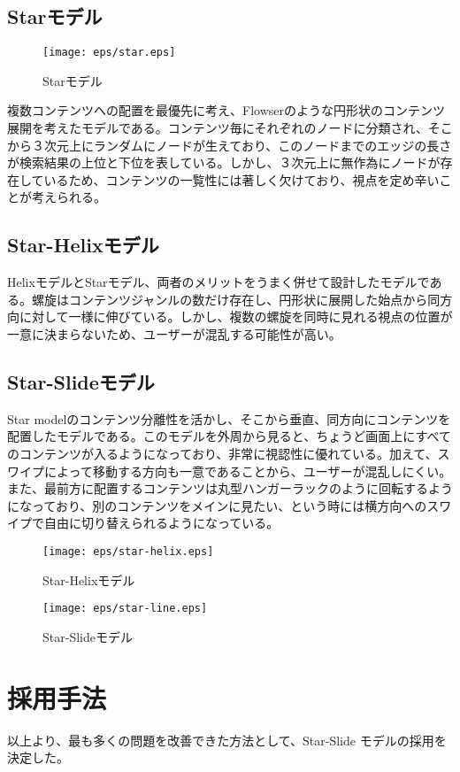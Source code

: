 \subsection{Starモデル}
\begin{figure}[htbp]
\begin{center}
\texttt{[image: eps/star.eps]}
\caption{Starモデル}
\label{star}
\end{center}
\end{figure}
複数コンテンツへの配置を最優先に考え、Flowserのような円形状のコンテンツ展開を考えたモデルである。コンテンツ毎にそれぞれのノードに分類され、そこから３次元上にランダムにノードが生えており、このノードまでのエッジの長さが検索結果の上位と下位を表している。しかし、３次元上に無作為にノードが存在しているため、コンテンツの一覧性には著しく欠けており、視点を定め辛いことが考えられる。

\subsection{Star-Helixモデル}
HelixモデルとStarモデル、両者のメリットをうまく併せて設計したモデルである。螺旋はコンテンツジャンルの数だけ存在し、円形状に展開した始点から同方向に対して一様に伸びている。しかし、複数の螺旋を同時に見れる視点の位置が一意に決まらないため、ユーザーが混乱する可能性が高い。

\subsection{Star-Slideモデル}
Star modelのコンテンツ分離性を活かし、そこから垂直、同方向にコンテンツを配置したモデルである。このモデルを外周から見ると、ちょうど画面上にすべてのコンテンツが入るようになっており、非常に視認性に優れている。加えて、スワイプによって移動する方向も一意であることから、ユーザーが混乱しにくい。また、最前方に配置するコンテンツは丸型ハンガーラックのように回転するようになっており、別のコンテンツをメインに見たい、という時には横方向へのスワイプで自由に切り替えられるようになっている。

\begin{figure}[htbp]
 \begin{minipage}{0.46\hsize}
  \begin{center}
   \texttt{[image: eps/star-helix.eps]}
  \end{center}
  \caption{Star-Helixモデル}
  \label{star-helix}
 \end{minipage}
 \begin{minipage}{0.46\hsize}
  \begin{center}
   \texttt{[image: eps/star-line.eps]}
  \end{center}
  \caption{Star-Slideモデル}
  \label{star-slide}
 \end{minipage}
\end{figure}
\section{採用手法}
以上より、最も多くの問題を改善できた方法として、Star-Slide モデルの採用を決定した。